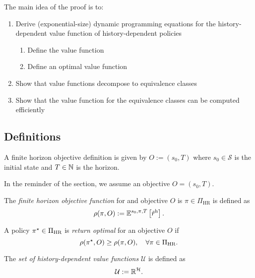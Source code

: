 The main idea of the proof is to:
\begin{enumerate}
\item Derive (exponential-size) dynamic programming equations for the history-dependent value function of history-dependent policies
  \begin{enumerate}
    \item Define the value function
    \item Define an optimal value function
  \end{enumerate}
\item Show that value functions decompose to equivalence classes
\item Show that the value function for the equivalence classes can be computed efficiently
\end{enumerate}

\subsection{Definitions}

\begin{definition} \label{def:ObjectiveFH}
  A finite horizon objective definition is given by $O := (s_0, T)$ where $s_0\in \mathcal{S}$ is the initial state and $T\in \mathbb{N}$ is the horizon.
   \leanok
\end{definition}

In the reminder of the section, we assume an objective $O = (s_0, T)$.

\begin{definition} \label{sec:objective-fh}
  The \emph{finite horizon objective function} for and objective $O$ is $\pi\in \Pi_{\mathrm{HR}}$ is defined as
  \[
    \rho(\pi, O)
    :=
    \mathbb{E}^{s_0, \pi, T} \left[\tilde{r}^{\mathrm{h}} \right].
  \]
   \leanok
\end{definition}

\begin{definition}\label{def:optimal-fh}
  A policy $\pi^{\star}\in \Pi_{\mathrm{HR}}$ is \emph{return optimal} for an objective $O$ if
  \[
   \rho(\pi^{\star}, O) \ge \rho(\pi, O), \quad \forall \pi \in \Pi_{\mathrm{HR}}.
 \]
  \leanok
\end{definition}

\begin{definition} \label{def:values-h}
  The \emph{set of history-dependent value functions} $\mathcal{U}$ is defined as
  \[
   \mathcal{U} := \mathbb{R}^{\mathcal{H}}.
 \]
  \leanok
\end{definition}

